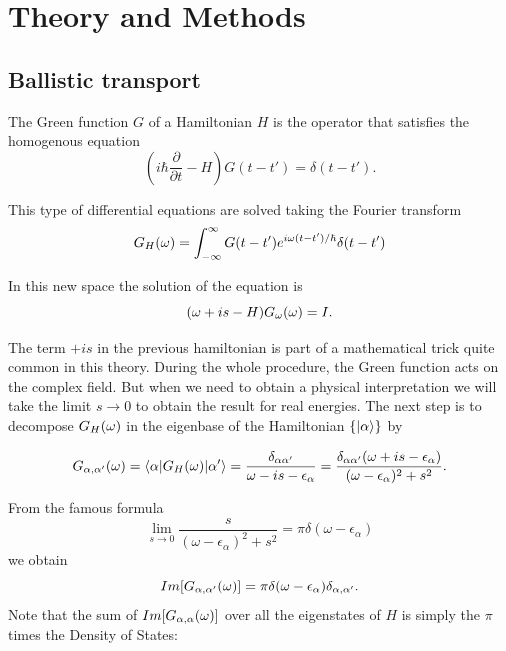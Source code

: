 \chapter{Theory and Methods}

\section{Ballistic transport \label{sec:transport} }

The Green function $G$ of a Hamiltonian $H$ is the operator that satisfies the homogenous equation 
\begin{equation}
    \left(i\hbar\frac{\partial}{\partial t}-H\right)G\left(t-t'\right)=\delta(t-t').
\end{equation}

This type of differential equations are solved taking the Fourier transform 
\begin{equation}
    G_{H}(\omega)=\int_{-\infty}^{\infty}G(t-t')e^{i\omega(t-t')/\hbar}\delta(t-t')
\end{equation}

In this new space the solution of the equation is 
$$(\omega+is -H)G_{\omega}(\omega)=I.$$ 

The term $+is$ in the previous hamiltonian is part of a mathematical trick quite common in this theory. During the whole procedure, the Green function acts on the complex field. But when we need to obtain a physical interpretation we will take the limit $s\rightarrow0$ to obtain the result for real energies. 
The next step is to decompose $G_{H}(\omega)$ in the eigenbase of the Hamiltonian $\{\vert \alpha \rangle\}$  by 


\begin{equation}
    G_{\alpha,\alpha'}(\omega)=\langle \alpha  \vert G_{H}(\omega)\vert \alpha' \rangle=\frac{\delta_{\alpha\alpha'}}{\omega - is -\epsilon_\alpha}=\frac{\delta_{\alpha\alpha'}(\omega + is -\epsilon_\alpha)}{(\omega-\epsilon_{\alpha})^{2}+s^{2}}.
\end{equation}

From the famous formula 
\begin{equation}
\lim_{s\rightarrow0}\frac{s}{(\omega-\epsilon_{\alpha})^{2}+s^{2}}=\pi\delta(\omega-\epsilon_{\alpha})
\end{equation}
we obtain 
\begin{equation}
    Im[G_{\alpha,\alpha'}(\omega)] = \pi \delta(\omega -\epsilon_\alpha)\delta_{\alpha,\alpha'}.
\end{equation}
Note that the sum of $Im[G_{\alpha,\alpha}(\omega)]$ over all the eigenstates of $H$ is simply the $\pi$ times the Density of States:

